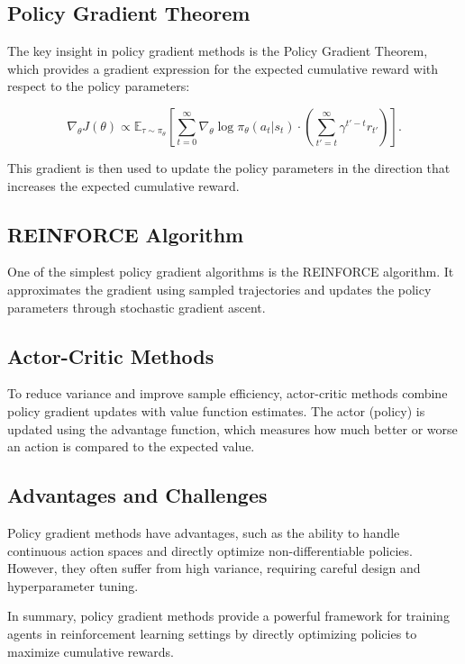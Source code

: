 \documentclass[conference]{IEEEtran}
\begin{document}
\subsection{Policy Gradient Theorem}

The key insight in policy gradient methods is the Policy Gradient Theorem, which provides a gradient expression for the expected cumulative reward with respect to the policy parameters:

\begin{equation}
\nabla_{\theta} J(\theta) \propto \mathbb{E}_{\tau \sim \pi_{\theta}} \left[ \sum_{t=0}^{\infty} \nabla_{\theta} \log \pi_{\theta}(a_t|s_t) \cdot \left( \sum_{t'=t}^{\infty} \gamma^{t'-t} r_{t'} \right) \right].
\end{equation}

This gradient is then used to update the policy parameters in the direction that increases the expected cumulative reward.

\subsection{REINFORCE Algorithm}

One of the simplest policy gradient algorithms is the REINFORCE algorithm. It approximates the gradient using sampled trajectories and updates the policy parameters through stochastic gradient ascent.

\subsection{Actor-Critic Methods}

To reduce variance and improve sample efficiency, actor-critic methods combine policy gradient updates with value function estimates. The actor (policy) is updated using the advantage function, which measures how much better or worse an action is compared to the expected value.

\subsection{Advantages and Challenges}

Policy gradient methods have advantages, such as the ability to handle continuous action spaces and directly optimize non-differentiable policies. However, they often suffer from high variance, requiring careful design and hyperparameter tuning.

In summary, policy gradient methods provide a powerful framework for training agents in reinforcement learning settings by directly optimizing policies to maximize cumulative rewards.
\end{document}
